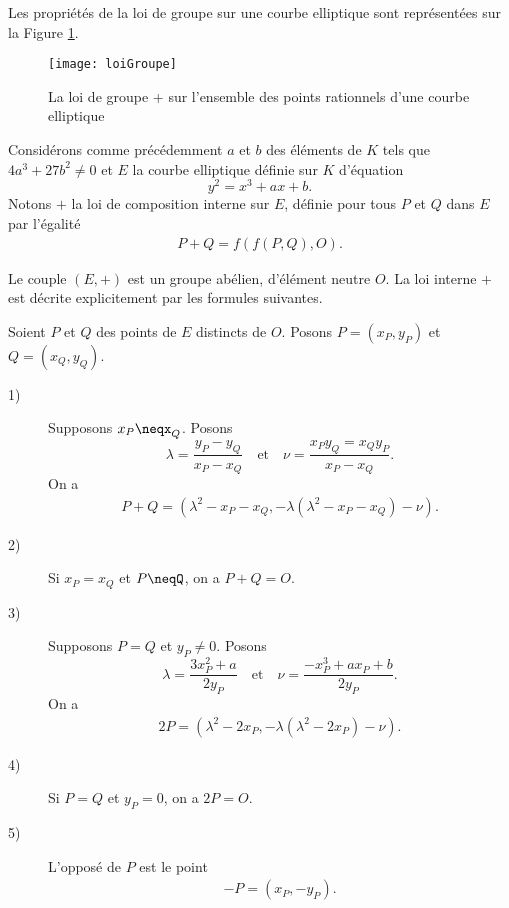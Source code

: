 Les propriétés de la loi de groupe sur une courbe elliptique sont représentées sur la Figure
\ref{fig:loiGroupe}.

\begin{figure}[H]
    \centering
    \texttt{[image: loiGroupe]}
    \caption{La loi de groupe + sur l'ensemble des points rationnels d'une courbe
    elliptique}
    \label{fig:loiGroupe}
\end{figure}

Considérons comme précédemment $a$ et $b$ des éléments de $K$ tels que $4a^3+27b^2\neq 0$ et $E$ la courbe elliptique définie sur $K$ d'équation
\[
y^2=x^3+ax+b
.\] 
Notons $+$ la loi de composition interne sur $E$, définie pour tous $P$ et $Q$ dans $E$ par l'égalité
\begin{align}
    \label{eq:groupe}
    P+Q=f(f(P,Q),O)
.\end{align}

\begin{theoreme}
    \label{th:theoreme1}
    Le couple $\left( E,+ \right) $ est un groupe abélien, d'élément neutre $O$. La loi interne $+$ est décrite explicitement par les formules suivantes.

    Soient $P$ et $Q$ des points de $E$ distincts de $O$. Posons $P=\left( x_P,y_P \right) $ et $Q=\left( x_Q,y_Q \right) $.

    \begin{description}
        \item[1)] Supposons $x_P\neqx_Q$. Posons 
            \[
            \lambda=\frac{y_P-y_Q}{x_P-x_Q} \quad \text{et} \quad \nu=\frac{x_Py_Q=x_Qy_P}{x_P-x_Q}
            .\] 
            On a 
            \begin{align}
                \label{eq:add1}
            P+Q=\left( \lambda^2-x_P-x_Q,-\lambda\left( \lambda^2-x_P-x_Q \right) -\nu  \right) 
            .\end{align}
            \item[2)] Si $x_P=x_Q$ et $P\neqQ$, on a $P+Q=O$.
            \item[3)] Supposons $P=Q$ et $y_P\neq 0$. Posons 
                \[
                \lambda=\frac{3x_P^2+a}{2y_P} \quad \text{et} \quad \nu=\frac{-x_P^3+ax_P+b}{2y_P}
                .\] 
                On a 
                \begin{align}
                    \label{eq:add2}
                2P=\left( \lambda^2-2x_P,-\lambda\left( \lambda^2-2x_P \right) -\nu \right) 
                .\end{align}
        \item[4)] Si $P=Q$ et $y_P=0$, on a $2P=O$.
        \item[5)] L'opposé de $P$ est le point
            \begin{align}
                \label{eq:add3}
                -P=\left( x_P,-y_P \right) 
            .\end{align}
    \end{description}
\end{theoreme}

